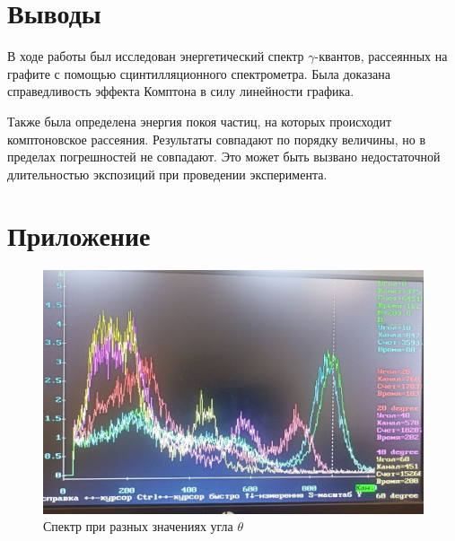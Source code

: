 \documentclass[a4paper,12pt]{article}
\begin{document}
\section{Выводы}

В ходе работы был исследован энергетический спектр $\gamma$-квантов, рассеянных на графите с помощью сцинтилляционного спектрометра. Была доказана справедливость эффекта Комптона
в силу линейности графика.

Также была определена энергия покоя частиц, на которых происходит комптоновское рассеяния. Результаты совпадают по порядку величины, но в пределах погрешностей не совпадают. Это может быть вызвано недостаточной длительностью экспозиций при проведении эксперимента.

\section{Приложение}

\begin{figure}[h]
\centering
\includegraphics[width=1\linewidth]{comp.jpg}
\caption{Спектр при разных значениях угла $\theta$}
\label{comp}
\end{figure}
\end{document}
